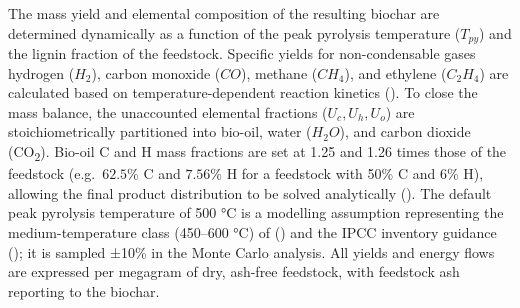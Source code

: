 \documentclass[
  letterpaper,
]{article}
\begin{document}
The mass yield and elemental composition of the resulting biochar are
determined dynamically as a function of the peak pyrolysis temperature
(\(T_{py}\)) and the lignin fraction of the feedstock. Specific yields
for non-condensable gases hydrogen (\(H_2\)), carbon monoxide (\(CO\)),
methane (\(CH_4\)), and ethylene (\(C_2H_4\)) are calculated based on
temperature-dependent reaction kinetics
(). To close the mass balance, the
unaccounted elemental fractions (\(U_c, U_h, U_o\)) are
stoichiometrically partitioned into bio-oil, water (\(H_2O\)), and
carbon dioxide (CO\textsubscript{2}). Bio-oil C and H mass fractions are
set at 1.25 and 1.26 times those of the feedstock
(e.g.~\(62.5\%\text{ C}\) and \(7.56\%\text{ H}\) for a feedstock with
50\% C and 6\% H), allowing the final product distribution to be solved
analytically (). The default peak
pyrolysis temperature of 500 °C is a modelling assumption representing
the medium-temperature class (450--600 °C) of
() and the IPCC inventory
guidance (); it is sampled
±10\% in the Monte Carlo analysis. All yields and energy flows are
expressed per megagram of dry, ash-free feedstock, with feedstock ash
reporting to the biochar.
\end{document}

